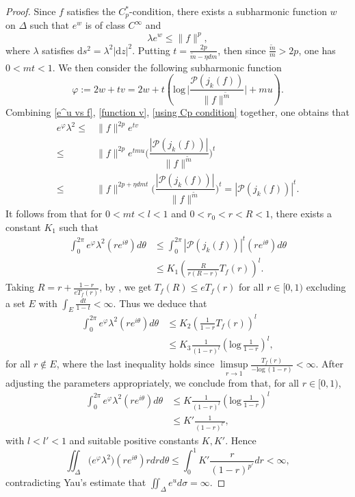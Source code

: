 \documentclass[english, 12pt]{amsart}
\def\log{\mathrm{log}\,}
\theoremstyle{plain}
\theoremstyle{remark}
\numberwithin{equation}{section}
\theoremstyle{plain}
\theoremstyle{named}
\begin{document}
\begin{proof}
	Since $f$ satisfies the $C_p^*$-condition, there exists a subharmonic function $w$ on $\Delta$ such that $e^w$ is of class $C^{\infty}$ and
	\begin{equation}
		\label{using Cp condition}
		\lambda e^w\leq \|f\|^p,
	\end{equation}
	where $\lambda$ satisfies $\mathrm{d}s^2=\lambda^2|\mathrm{d}z|^2$. Putting $t=\frac{2p}{\tilde{m}-\eta dm}$, then since $\frac{\tilde{m}}{m}>2p$, one has $0<mt<1$. We then consider the following subharmonic function
	\[
	\varphi:=2w+tv=2w+t\left(\log \bigg|\dfrac{\mathscr{P}(j_k(f))}{\|f\|^{\tilde{m}}}\bigg|+mu\right).
	\]
	Combining \eqref{e^u vs f}, \eqref{function v}, \eqref{using Cp condition} together, one obtains that
	\begin{align*}
		e^{\varphi}\lambda^2
		\leq & \|f\|^{2p}e^{tv}\\
		\leq & \|f\|^{2p}e^{tmu}\bigg(\dfrac{|\mathscr{P}(j_k(f))|}{\|f\|^{\tilde{m}}}\bigg)^t\\
		\leq & \|f\|^{2p+\eta dmt}\bigg(\dfrac{|\mathscr{P}(j_k(f))|}{\|f\|^{\tilde{m}}}\bigg)^t=|\mathscr{P}(j_k(f))|^t.
	\end{align*}
	It follows from \cite[Lemma 2.2]{Cai-Ru-Yang25} that for $0<mt<l<1$ and $0<r_0<r<R<1$, there exists a constant $K_1$ such that
	\begin{align*}
		\int_{0}^{2\pi}e^{\varphi}\lambda^2 (re^{i\theta})d\theta & \leq \int_{0}^{2\pi}|\mathscr{P}(j_k(f))|^t (re^{i\theta})d\theta\\
		& \leq K_1\left(\frac{R}{r(R-r)}T_f(r)\right)^l.
	\end{align*}
	Taking $R=r+\frac{1-r}{e T_f(r)}$, by \cite[Lemma 4.1.7]{Ru2023}, we get $T_f(R)\leq eT_f(r)$ for all $r\in [0,1)$ excluding a set $E$ with $\int_E \frac{dt}{1-t} <\infty$. Thus we deduce that
	\begin{align*}
		\int_{0}^{2\pi}e^{\varphi}\lambda^2 (re^{i\theta})d\theta &\leq K_2\left(\frac{1}{1-r}T_f(r)\right)^l\\
		& \leq K_3 \frac{1}{(1-r)^l}\left(\log \frac{1}{1-r}\right)^l,
	\end{align*}
	for all $r\notin E$, where the last inequality holds since $\limsup\limits_{r\rightarrow 1}\frac{T_f(r)}{-\log (1-r)}<\infty$. After adjusting the parameters appropriately, we conclude from \cite[Proposition 4.1.8]{Ru2023} that, for all $r\in [0,1)$,
	\begin{align*}
		\int_{0}^{2\pi}e^{\varphi}\lambda^2 (re^{i\theta})d\theta &\leq K \frac{1}{(1-r)^l}\left(\log \frac{1}{1-r}\right)^l\\
		&\leq K' \frac{1}{(1-r)^{l'}},
	\end{align*}
	with $l<l'<1$ and suitable positive constants $K,K'$. Hence
	\[
	\iint_{\Delta}\big(e^{\varphi}\lambda^2\big)(re^{i\theta})rdrd\theta\leq \int_{0}^{1} K' \frac{r}{(1-r)^{p'}}dr<\infty,
	\]
	contradicting Yau's estimate \cite{Yau76} that $\iint_{\Delta} e^ud\sigma =\infty$.
\end{proof}
\end{document}
